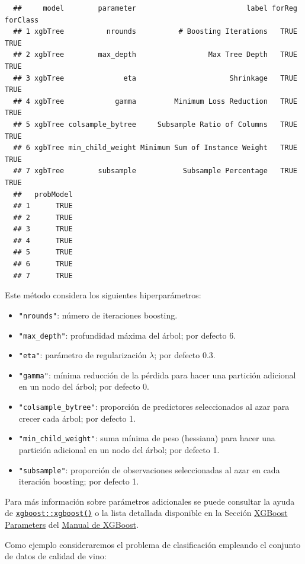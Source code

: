 \documentclass[
]{book}
\theoremstyle{break}
\theoremstyle{nonumberplain}
\begin{document}
\begin{verbatim}
  ##     model        parameter                          label forReg forClass
  ## 1 xgbTree          nrounds          # Boosting Iterations   TRUE     TRUE
  ## 2 xgbTree        max_depth                 Max Tree Depth   TRUE     TRUE
  ## 3 xgbTree              eta                      Shrinkage   TRUE     TRUE
  ## 4 xgbTree            gamma         Minimum Loss Reduction   TRUE     TRUE
  ## 5 xgbTree colsample_bytree     Subsample Ratio of Columns   TRUE     TRUE
  ## 6 xgbTree min_child_weight Minimum Sum of Instance Weight   TRUE     TRUE
  ## 7 xgbTree        subsample           Subsample Percentage   TRUE     TRUE
  ##   probModel
  ## 1      TRUE
  ## 2      TRUE
  ## 3      TRUE
  ## 4      TRUE
  ## 5      TRUE
  ## 6      TRUE
  ## 7      TRUE
\end{verbatim}

Este método considera los siguientes hiperparámetros:

\begin{itemize}
\item
  \texttt{"nrounds"}: número de iteraciones boosting.
\item
  \texttt{"max\_depth"}: profundidad máxima del árbol; por defecto 6.
\item
  \texttt{"eta"}: parámetro de regularización \(\lambda\); por defecto 0.3.
\item
  \texttt{"gamma"}: mínima reducción de la pérdida para hacer una partición adicional en un nodo del árbol; por defecto 0.
\item
  \texttt{"colsample\_bytree"}: proporción de predictores seleccionados al azar para crecer cada árbol; por defecto 1.
\item
  \texttt{"min\_child\_weight"}: suma mínima de peso (hessiana) para hacer una partición adicional en un nodo del árbol; por defecto 1.
\item
  \texttt{"subsample"}: proporción de observaciones seleccionadas al azar en cada iteración boosting; por defecto 1.
\end{itemize}

Para más información sobre parámetros adicionales se puede consultar la ayuda de \href{https://rdrr.io/pkg/xgboost/man/xgb.train.html}{\texttt{xgboost::xgboost()}} o la lista detallada disponible en la Sección \href{https://xgboost.readthedocs.io/en/latest/parameter.html}{XGBoost Parameters} del \href{https://xgboost.readthedocs.io}{Manual de XGBoost}.

Como ejemplo consideraremos el problema de clasificación empleando el conjunto de datos de calidad de vino:
\end{document}
